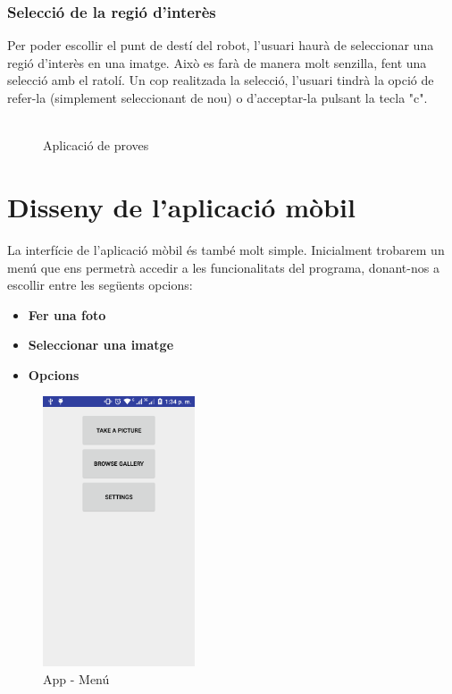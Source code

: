 	\subsubsection{Selecció de la regió d'interès}
		Per poder escollir el punt de destí del robot, l'usuari haurà de seleccionar una regió d'interès en una imatge. Això es farà de manera molt senzilla, fent una selecció amb el ratolí.
		Un cop realitzada la selecció, l'usuari tindrà la opció de refer-la (simplement seleccionant de nou) o d'acceptar-la pulsant la tecla "c".\\\\
		\begin{figure}[!htb]
			\caption{Aplicació de proves}
		\end{figure}
\newpage
\section{Disseny de l'aplicació mòbil}
	La interfície de l'aplicació mòbil és també molt simple. Inicialment trobarem un menú que ens permetrà accedir a les funcionalitats del programa, donant-nos a escollir entre les següents opcions:
	\begin{itemize}
		\item{\textbf{Fer una foto}}
		\item{\textbf{Seleccionar una imatge}}
		\item{\textbf{Opcions}}
	\end{itemize}
	\begin{figure}[H]
		\centering
		\includegraphics[width=0.4\textwidth]{images/menu}
		\caption{App - Menú}
	\end{figure}
